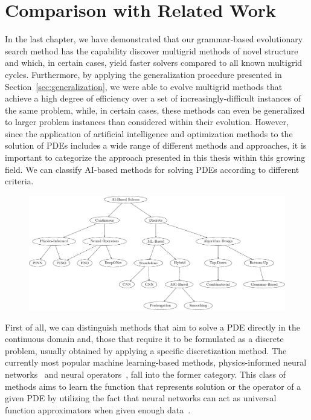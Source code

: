 \section{Comparison with Related Work}
In the last chapter, we have demonstrated that our grammar-based evolutionary search method has the capability discover multigrid methods of novel structure and which, in certain cases, yield faster solvers compared to all known multigrid cycles.
Furthermore, by applying the generalization procedure presented in  Section~\ref{sec:generalization}, we were able to evolve multigrid methods that achieve a high degree of efficiency over a set of increasingly-difficult instances of the same problem, while, in certain cases, these methods can even be generalized to larger problem instances than considered within their evolution.
However, since the application of artificial intelligence and optimization methods to the solution of PDEs includes a wide range of different methods and approaches, it is important to categorize the approach presented in this thesis within this growing field.
We can classify AI-based methods for solving PDEs according to different criteria.
\begin{figure}
	\includegraphics[width=\textwidth]{figures/trees/related_work.pdf}
	\caption{}
	\label{}
\end{figure}
First of all, we can distinguish methods that aim to solve a PDE directly in the continuous domain and, those that require it to be formulated as a discrete problem, usually obtained by applying a specific discretization method.
The currently most popular machine learning-based methods, physics-informed neural networks~\cite{karniadakis2021physics,raissi2019physics,kharazmi2019variational,kharazmi2021hp} and neural operators~\cite{li2020fourier,guibas2021efficient,lu2021learning,li2021physics}, fall into the former category.
This class of methods aims to learn the function that represents solution or the operator of a given PDE by utilizing the fact that neural networks can act as universal function approximators when given enough data~\cite{hornik1989multilayer}.
